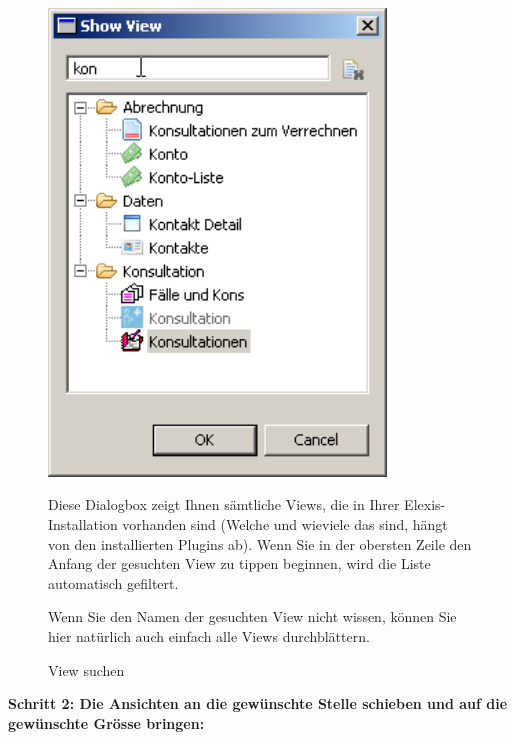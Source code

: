 \begin{figure}[htbp]
   \begin{minipage}{0.4\textwidth}
       \centering
       \includegraphics[width=0.8\textwidth]{images/customize1}
       \caption{View suchen}
       \label{fig:cust1}
     \end{minipage}\hfill
     \begin{minipage}{0.5\textwidth}
        Diese Dialogbox zeigt Ihnen sämtliche Views, die in Ihrer Elexis-Installation vorhanden sind (Welche und wieviele das sind, hängt von den installierten Plugins ab). Wenn Sie in der obersten Zeile den Anfang der gesuchten View zu tippen beginnen, wird die Liste automatisch gefiltert.

        Wenn Sie den Namen der gesuchten View nicht wissen, können Sie hier natürlich auch einfach alle Views durchblättern.
    \end{minipage}
\end{figure}

\bigskip
\pagebreak[3]
\textbf{Schritt 2: Die Ansichten an die gewünschte Stelle schieben und auf die gewünschte Grösse bringen:}\\

